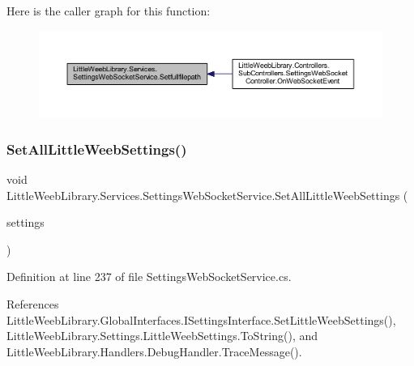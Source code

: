 Here is the caller graph for this function\+:\nopagebreak
\begin{figure}[H]
\begin{center}
\leavevmode
\includegraphics[width=350pt]{class_little_weeb_library_1_1_services_1_1_settings_web_socket_service_aef49a5d18d17b206d2807bba6c28f793_icgraph}
\end{center}
\end{figure}
\mbox{\label{class_little_weeb_library_1_1_services_1_1_settings_web_socket_service_a5ae643bad024f7eca3178d5359886f6f}} 
\subsubsection{\texorpdfstring{Set\+All\+Little\+Weeb\+Settings()}{SetAllLittleWeebSettings()}}
{\footnotesize\ttfamily void Little\+Weeb\+Library.\+Services.\+Settings\+Web\+Socket\+Service.\+Set\+All\+Little\+Weeb\+Settings (\begin{DoxyParamCaption}\item[{\mbox{\hyperlink{class_little_weeb_library_1_1_settings_1_1_little_weeb_settings}{Little\+Weeb\+Settings}}}]{settings }\end{DoxyParamCaption})\hspace{0.3cm}{\ttfamily [private]}}



Definition at line 237 of file Settings\+Web\+Socket\+Service.\+cs.



References Little\+Weeb\+Library.\+Global\+Interfaces.\+I\+Settings\+Interface.\+Set\+Little\+Weeb\+Settings(), Little\+Weeb\+Library.\+Settings.\+Little\+Weeb\+Settings.\+To\+String(), and Little\+Weeb\+Library.\+Handlers.\+Debug\+Handler.\+Trace\+Message().


